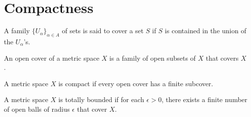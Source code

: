 \documentclass[nobib,notoc]{tufte-handout}
\begin{document}
\section{Compactness}
\begin{defi}[Cover]
	A family \(\{U_{\alpha}\}_{\alpha\in A}\) of sets is said to cover a set \(S\) if \(S\) is contained in the union of the \(U_{\alpha}\)'s.
\end{defi}
\begin{defi}
	An open cover of a metric space \(X\) is a family of open subsets of \(X\) that covers \(X\).
\end{defi}
\begin{defi}[Compactness]
	A metric space \(X\) is compact if every open cover has a finite subcover.
\end{defi}
\begin{defi}
	A metric space \(X\) is totally bounded if for each \(\epsilon>0\), there exists a finite number of open balls of radius \(\epsilon\) that cover \(X\).
\end{defi}
\end{document}
